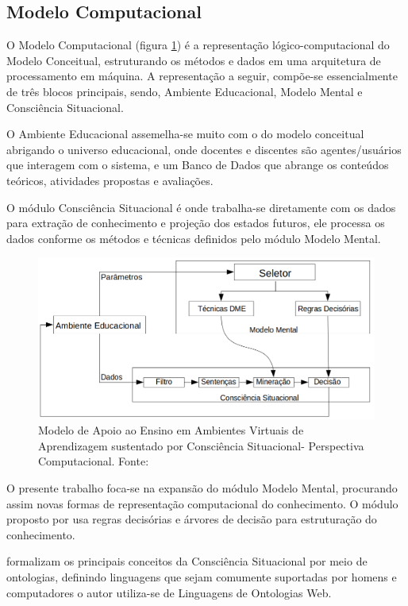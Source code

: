 \documentclass[
	oneside,
	12pt,				%
	a4paper,			%
	english,			%
	brazil,				%
	article
	]{abntex2}
\begin{document}
{\subsection{Modelo Computacional}

O Modelo Computacional (figura \ref{modeloSAemAVAcomp}) é a representação lógico-computacional do Modelo Conceitual, estruturando os métodos e dados em uma arquitetura de processamento em máquina. A representação a seguir, compõe-se essencialmente de três blocos principais, sendo, Ambiente Educacional, Modelo Mental e Consciência Situacional.

O Ambiente Educacional assemelha-se muito com o do modelo conceitual abrigando o universo educacional, onde docentes e discentes são agentes/usuários que interagem com o sistema, e um Banco de Dados que abrange os conteúdos teóricos, atividades propostas e avaliações.

O módulo Consciência Situacional é onde trabalha-se diretamente com os dados para extração de conhecimento e projeção dos estados futuros, ele processa os dados conforme os métodos e técnicas definidos pelo módulo Modelo Mental.

\begin{figure}[H]	
	\centering
	\includegraphics[scale=0.4]{modelo_persp_comp}
	\caption{Modelo de Apoio ao Ensino em Ambientes Virtuais de Aprendizagem sustentado por Consciência Situacional- Perspectiva Computacional. Fonte: \cite{Martins2018} }
	\label{modeloSAemAVAcomp}	
\end{figure}

O presente trabalho foca-se na expansão do módulo Modelo Mental, procurando assim novas formas de representação computacional do conhecimento. O módulo proposto por  usa regras decisórias e árvores de decisão para estruturação do conhecimento.

 formalizam os principais conceitos da Consciência Situacional por meio de ontologias, definindo linguagens que sejam comumente suportadas por homens e computadores o autor utiliza-se de Linguagens de Ontologias Web. 

}
\end{document}
